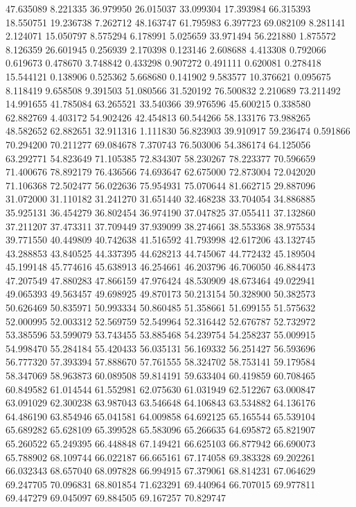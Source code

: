 47.635089
8.221335
36.979950
26.015037
33.099304
17.393984
66.315393
18.550751
19.236738
7.262712
48.163747
61.795983
6.397723
69.082109
8.281141
2.124071
15.050797
8.575294
6.178991
5.025659
33.971494
56.221880
1.875572
8.126359
26.601945
0.256939
2.170398
0.123146
2.608688
4.413308
0.792066
0.619673
0.478670
3.748842
0.433298
0.907272
0.491111
0.620081
0.278418
15.544121
0.138906
0.525362
5.668680
0.141902
9.583577
10.376621
0.095675
8.118419
9.658508
9.391503
51.080566
31.520192
76.500832
2.210689
73.211492
14.991655
41.785084
63.265521
33.540366
39.976596
45.600215
0.338580
62.882769
4.403172
54.902426
42.454813
60.544266
58.133176
73.988265
48.582652
62.882651
32.911316
1.111830
56.823903
39.910917
59.236474
0.591866
70.294200
70.211277
69.084678
7.370743
76.503006
54.386174
64.125056
63.292771
54.823649
71.105385
72.834307
58.230267
78.223377
70.596659
71.400676
78.892179
76.436566
74.693647
62.675000
72.873004
72.042020
71.106368
72.502477
56.022636
75.954931
75.070644
81.662715
29.887096
31.072000
31.110182
31.241270
31.651440
32.468238
33.704054
34.886885
35.925131
36.454279
36.802454
36.974190
37.047825
37.055411
37.132860
37.211207
37.473311
37.709449
37.939099
38.274661
38.553368
38.975534
39.771550
40.449809
40.742638
41.516592
41.793998
42.617206
43.132745
43.288853
43.840525
44.337395
44.628213
44.745067
44.772432
45.189504
45.199148
45.774616
45.638913
46.254661
46.203796
46.706050
46.884473
47.207549
47.880283
47.866159
47.976424
48.530909
48.673464
49.022941
49.065393
49.563457
49.698925
49.870173
50.213154
50.328900
50.382573
50.626469
50.835971
50.993334
50.860485
51.358661
51.699155
51.575632
52.000995
52.003312
52.569759
52.549964
52.316442
52.676787
52.732972
53.385596
53.599079
53.743455
53.885468
54.239754
54.258237
55.009915
54.998470
55.284184
55.420433
56.035131
56.169332
56.251427
56.593696
56.777320
57.393394
57.888670
57.761555
58.324702
58.753141
59.179584
58.347069
58.963873
60.089508
59.814191
59.633404
60.419859
60.708465
60.849582
61.014544
61.552981
62.075630
61.031949
62.512267
63.000847
63.091029
62.300238
63.987043
63.546648
64.106843
63.534882
64.136176
64.486190
63.854946
65.041581
64.009858
64.692125
65.165544
65.539104
65.689282
65.628109
65.399528
65.583096
65.266635
64.695872
65.821907
65.260522
65.249395
66.448848
67.149421
66.625103
66.877942
66.690073
65.788902
68.109744
66.022187
66.665161
67.174058
69.383328
69.202261
66.032343
68.657040
68.097828
66.994915
67.379061
68.814231
67.064629
69.247705
70.096831
68.801854
71.623291
69.440964
66.707015
69.977811
69.447279
69.045097
69.884505
69.167257
70.829747
